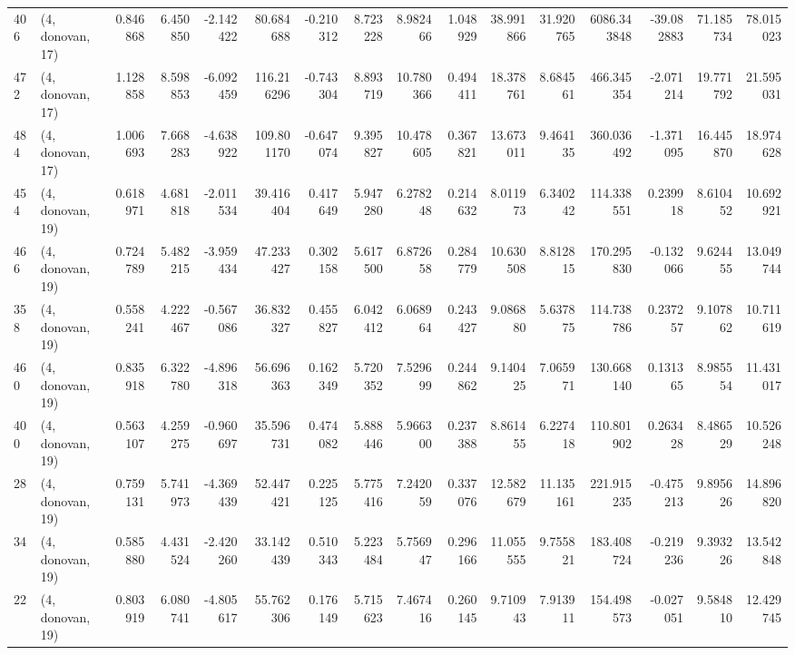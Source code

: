 \begin{tabular}{llrrrrrrrrrrrrrr}
406 &  (4, donovan, 17) &   0.846868 &   6.450850 &  -2.142422 &    80.684688 &  -0.210312 &   8.723228 &   8.982466 &  1.048929 &  38.991866 &  31.920765 &  6086.343848 & -39.082883 &  71.185734 &  78.015023 \\
472 &  (4, donovan, 17) &   1.128858 &   8.598853 &  -6.092459 &   116.216296 &  -0.743304 &   8.893719 &  10.780366 &  0.494411 &  18.378761 &   8.684561 &   466.345354 &  -2.071214 &  19.771792 &  21.595031 \\
484 &  (4, donovan, 17) &   1.006693 &   7.668283 &  -4.638922 &   109.801170 &  -0.647074 &   9.395827 &  10.478605 &  0.367821 &  13.673011 &   9.464135 &   360.036492 &  -1.371095 &  16.445870 &  18.974628 \\
454 &  (4, donovan, 19) &   0.618971 &   4.681818 &  -2.011534 &    39.416404 &   0.417649 &   5.947280 &   6.278248 &  0.214632 &   8.011973 &   6.340242 &   114.338551 &   0.239918 &   8.610452 &  10.692921 \\
466 &  (4, donovan, 19) &   0.724789 &   5.482215 &  -3.959434 &    47.233427 &   0.302158 &   5.617500 &   6.872658 &  0.284779 &  10.630508 &   8.812815 &   170.295830 &  -0.132066 &   9.624455 &  13.049744 \\
358 &  (4, donovan, 19) &   0.558241 &   4.222467 &  -0.567086 &    36.832327 &   0.455827 &   6.042412 &   6.068964 &  0.243427 &   9.086880 &   5.637875 &   114.738786 &   0.237257 &   9.107862 &  10.711619 \\
460 &  (4, donovan, 19) &   0.835918 &   6.322780 &  -4.896318 &    56.696363 &   0.162349 &   5.720352 &   7.529699 &  0.244862 &   9.140425 &   7.065971 &   130.668140 &   0.131365 &   8.985554 &  11.431017 \\
400 &  (4, donovan, 19) &   0.563107 &   4.259275 &  -0.960697 &    35.596731 &   0.474082 &   5.888446 &   5.966300 &  0.237388 &   8.861455 &   6.227418 &   110.801902 &   0.263428 &   8.486529 &  10.526248 \\
28  &  (4, donovan, 19) &   0.759131 &   5.741973 &  -4.369439 &    52.447421 &   0.225125 &   5.775416 &   7.242059 &  0.337076 &  12.582679 &  11.135161 &   221.915235 &  -0.475213 &   9.895626 &  14.896820 \\
34  &  (4, donovan, 19) &   0.585880 &   4.431524 &  -2.420260 &    33.142439 &   0.510343 &   5.223484 &   5.756947 &  0.296166 &  11.055555 &   9.755821 &   183.408724 &  -0.219236 &   9.393226 &  13.542848 \\
22  &  (4, donovan, 19) &   0.803919 &   6.080741 &  -4.805617 &    55.762306 &   0.176149 &   5.715623 &   7.467416 &  0.260145 &   9.710943 &   7.913911 &   154.498573 &  -0.027051 &   9.584810 &  12.429745 \\

\end{tabular}
